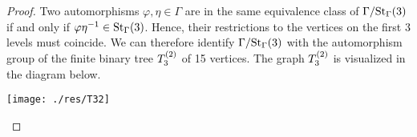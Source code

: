 \begin{proof}
Two automorphisms $\varphi,\eta\in\Gamma$ are in the same equivalence class of $\nicefrac{\Gamma}{\St[\Gamma]{3}}$ if and only if $\varphi\eta^{-1}\in\St[\Gamma]{3}$. Hence, their restrictions to the vertices on the first 3 levels must coincide. We can therefore identify $\nicefrac{\Gamma}{\St[\Gamma]{3}}$ with the automorphism group of the finite binary tree $\T_3$ of 15 vertices. The graph  $\T_3$ is visualized in the diagram below.

\begin{center}
\texttt{[image: ./res/T32]}
%
%
%
\end{center}


\end{proof}
